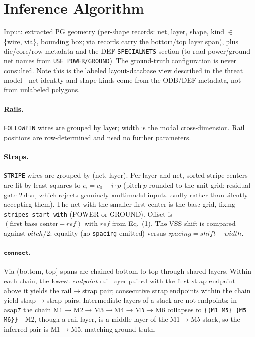 \documentclass[11pt]{article}
\begin{document}
\section{Inference Algorithm}

Input: extracted PG geometry (per-shape records: net, layer, shape,
kind $\in$ \{wire, via\}, bounding box; via records carry the bottom/top
layer span), plus die/core/row metadata and the DEF \texttt{SPECIALNETS}
section (to read power/ground net names from \texttt{USE POWER/GROUND}).
The ground-truth configuration is never consulted.  Note this is the
labeled layout-database view described in the threat model---net identity
and shape kinds come from the ODB/DEF metadata, not from unlabeled
polygons.

\paragraph{Rails.} \texttt{FOLLOWPIN} wires are grouped by layer; width is
the modal cross-dimension.  Rail positions are row-determined and need no
further parameters.

\paragraph{Straps.} \texttt{STRIPE} wires are grouped by (net, layer).
Per layer and net, sorted stripe centers are fit by least squares to
$c_i = c_0 + i\cdot p$ (pitch $p$ rounded to the unit grid; residual gate
2\,dbu, which rejects genuinely multimodal inputs loudly rather than
silently accepting them).  The
net with the smaller first center is the base grid, fixing
\texttt{stripes\_start\_with} (POWER or GROUND).  Offset is
$(\text{first base center} - \mathit{ref})$ with $\mathit{ref}$ from
Eq.~(1).  The VSS shift is compared against $\mathit{pitch}/2$: equality
(no \texttt{spacing} emitted) versus $\mathit{spacing} = \mathit{shift} -
\mathit{width}$.

\paragraph{\texttt{connect}.} Via (bottom, top) spans are chained
bottom-to-top through shared layers.  Within each chain, the lowest
\emph{endpoint} rail layer paired with the first strap endpoint above it
yields the rail$\to$strap pair; consecutive strap endpoints within the
chain yield strap$\to$strap pairs.  Intermediate layers of a stack are not
endpoints: in asap7 the chain M1$\to$M2$\to$M3$\to$M4$\to$M5$\to$M6
collapses to \texttt{\{\{M1 M5\} \{M5 M6\}\}}---M2, though a rail layer,
is a middle layer of the M1$\to$M5 stack, so the inferred pair is
M1$\to$M5, matching ground truth.
\end{document}
